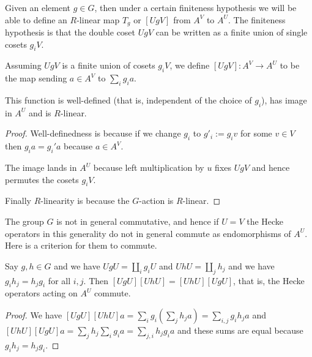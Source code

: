 Given an element $g\in G$, then under a certain finiteness hypothesis
we will be able to define an $R$-linear map $T_g$ or $[UgV]$
from $A^V$ to $A^U$. The finiteness hypothesis is that the
double coset $UgV$ can be written as a finite union of single
cosets $g_iV$.

\begin{definition}
  \label{AbstractHeckeOperator.HeckeOperator_toFun}
  \leanok
  Assuming $UgV$ is a finite union of cosets $g_iV$,
  we define $[UgV]:A^V\to A^U$ to be the map sending $a\in A^V$
  to $\sum_i g_ia.$
\end{definition}

\begin{lemma}
  \label{AbstractHeckeOperator.HeckeOperator}
  \leanok
  This function is well-defined (that is, independent of the
  choice of $g_i$), has image in $A^U$ and is $R$-linear.
\end{lemma}
\begin{proof}
  \leanok
  Well-definedness is because if we change $g_i$ to $g'_i:=g_iv$
  for some $v\in V$ then $g_ia=g_i'a$ because $a\in A^V$.

  The image lands in $A^U$ because left multiplication by $u$
  fixes $UgV$ and hence permutes the cosets $g_iV$.

  Finally $R$-linearity is because the $G$-action is $R$-linear.
\end{proof}

The group $G$ is not in general commutative, and hence if $U=V$
the Hecke operators in this generality do not in general commute
as endomorphisms of $A^U$. Here is a criterion for
them to commute.

\begin{lemma}
  \label{AbstractHeckeOperator.comm}
  \leanok
  Say $g,h\in G$ and we have $UgU=\coprod_i g_iU$
  and $UhU=\coprod_j h_j$ and we have $g_ih_j=h_jg_i$ for all $i,j$.
  Then $[UgU][UhU]=[UhU][UgU]$, that is, the Hecke operators
  acting on $A^U$ commute.
\end{lemma}
\begin{proof}
  \leanok
  We have $[UgU][UhU]a=\sum_ig_i(\sum_jh_ja)=\sum_{i,j}g_ih_ja$
  and $[UhU][UgU]a=\sum_jh_j\sum_ig_ia=\sum_{j,i}h_jg_ia$ and these
  sums are equal because $g_ih_j=h_jg_i$.
\end{proof}


